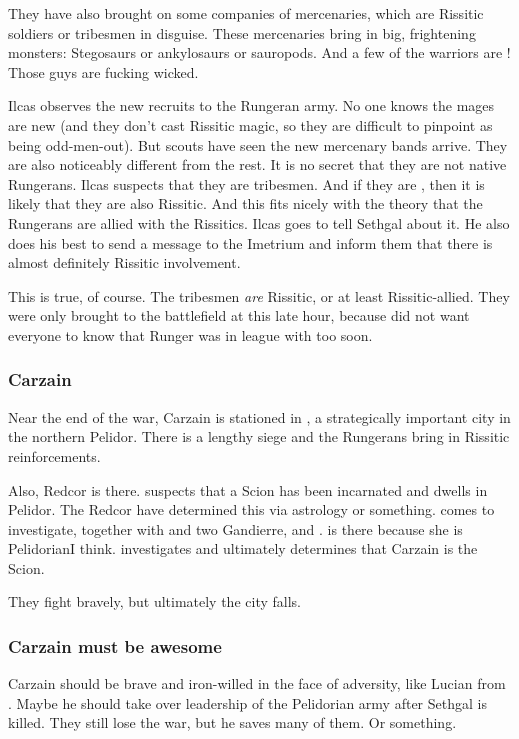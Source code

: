 They have also brought on some companies of mercenaries, which are Rissitic soldiers or \Durcaci{} tribesmen in disguise. 
These mercenaries bring in big, frightening monsters: 
Stegosaurs or ankylosaurs or sauropods. 
And a few of the warriors are \cregorrs!
Those guys are fucking wicked. 

Ilcas observes the new recruits to the Rungeran army. 
No one knows the mages are new (and they don't cast Rissitic magic, so they are difficult to pinpoint as being odd-men-out). 
But scouts have seen the new mercenary bands arrive. 
They are also noticeably different from the rest. 
It is no secret that they are not native Rungerans. 
Ilcas suspects that they are \Durcaci{} tribesmen. 
And if they are \Durcaci, then it is likely that they are also Rissitic. 
And this fits nicely with the theory that the Rungerans are allied with the Rissitics. 
Ilcas goes to tell Sethgal about it. 
He also does his best to send a message to the Imetrium and inform them that there is almost definitely Rissitic involvement. 

This is true, of course. 
The tribesmen \emph{are} Rissitic, or at least Rissitic-allied. 
They were only brought to the battlefield at this late hour, because \Takestsha{} did not want everyone to know that Runger was in league with \Durcac{} too soon. 





\subsubsection{Carzain}
Near the end of the war, Carzain is stationed in \Forclin{}, a strategically important city in the northern Pelidor. There is a lengthy siege and the Rungerans bring in Rissitic reinforcements. 

Also, Redcor \Matron{} \Esmerel{} is there. \Esmerel{} suspects that a Scion has been incarnated and dwells in Pelidor. The Redcor have determined this via astrology or something. \Esmerel{} comes to investigate, together with \Racel{} and two Gandierre, \France{} \Perival{} and \Isacc{} \Chiran. \Racel{} is there because she is Pelidorian\prikker I think. 
\Esmerel{} investigates and ultimately determines that Carzain is the Scion. 

They fight bravely, but ultimately the city falls.





\subsubsection{Carzain must be awesome}
Carzain should be brave and iron-willed in the face of adversity, like Lucian from \cite{Movie:UnderworldIII}. 
Maybe he should take over leadership of the Pelidorian army after Sethgal is killed. 
They still lose the war, but he saves many of them. 
Or something.





